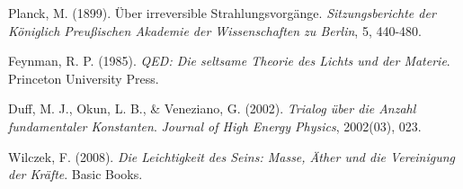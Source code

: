 \documentclass[12pt,a4paper]{article}
\begin{document}
\begin{thebibliography}{99}
		 Planck, M. (1899). Über irreversible Strahlungsvorgänge. \textit{Sitzungsberichte der Königlich Preußischen Akademie der Wissenschaften zu Berlin}, 5, 440-480.
		
		 Feynman, R. P. (1985). \textit{QED: Die seltsame Theorie des Lichts und der Materie}. Princeton University Press.
		
		 Duff, M. J., Okun, L. B., \& Veneziano, G. (2002). \textit{Trialog über die Anzahl fundamentaler Konstanten}. \textit{Journal of High Energy Physics}, 2002(03), 023.
		
		 Wilczek, F. (2008). \textit{Die Leichtigkeit des Seins: Masse, Äther und die Vereinigung der Kräfte}. Basic Books.
	\end{thebibliography}
	
\end{document}
